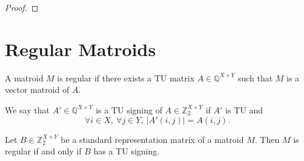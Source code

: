 \begin{proof}
    \leanok
    \SeeLean
\end{proof}


\section{Regular Matroids}

\begin{definition}
    \label{Matroid.IsRegular}
    \leanok
    A matroid $M$ is regular if there exists a TU matrix $A \in \mathbb{Q}^{X \times Y}$ such that $M$ is a vector matroid of $A$.
\end{definition}

\begin{definition}
    \label{Matrix.IsTuSigningOf}
    \leanok
    We say that $A' \in \mathbb{Q}^{X \times Y}$ is a TU signing of $A \in \mathbb{Z}_{2}^{X \times Y}$ if $A'$ is TU and
    \[
        \forall i \in X, \ \forall j \in Y, \ |A' (i, j)| = A (i, j).
    \]
\end{definition}


\begin{lemma}
    \label{StandardRepr.toMatroid_isRegular_iff_hasTuSigning}
    \leanok
    Let $B \in \mathbb{Z}_{2}^{X \times Y}$ be a standard representation matrix of a matroid $M$. Then $M$ is regular if and only if $B$ has a TU signing.
\end{lemma}

